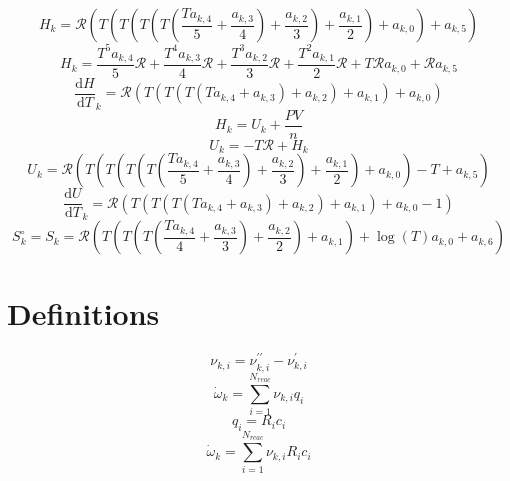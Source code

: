 \documentclass[a4paper,10pt]{article}
\newcommand{\nr}{N_{reac}}
\newcommand{\Ru}{\mathcal{R}}
\begin{document}
\begin{dmath} H_{k} = \Ru \left(T \left(T \left(T \left(T \left(\frac{T a_{k,4}}{5} + \frac{a_{k,3}}{4}\right) + \frac{a_{k,2}}{3}\right) + \frac{a_{k,1}}{2}\right) + a_{k,0}\right) + a_{k,5}\right)\end{dmath} 
\begin{dmath} H_{k} = \frac{T^{5} a_{k,4}}{5} \Ru + \frac{T^{4} a_{k,3}}{4} \Ru + \frac{T^{3} a_{k,2}}{3} \Ru + \frac{T^{2} a_{k,1}}{2} \Ru + T \Ru a_{k,0} + \Ru a_{k,5}\end{dmath} 
\begin{dmath} \frac{\text{d} H }{\text{d} T }_{k} = \Ru \left(T \left(T \left(T \left(T a_{k,4} + a_{k,3}\right) + a_{k,2}\right) + a_{k,1}\right) + a_{k,0}\right)\end{dmath} 
\begin{dmath} H_k = U_k + \frac{P V}{n}\end{dmath} 
\begin{dmath} U_{k} = - T \Ru + H_{k}\end{dmath} 
\begin{dmath} U_{k} = \Ru \left(T \left(T \left(T \left(T \left(\frac{T a_{k,4}}{5} + \frac{a_{k,3}}{4}\right) + \frac{a_{k,2}}{3}\right) + \frac{a_{k,1}}{2}\right) + a_{k,0}\right) - T + a_{k,5}\right)\end{dmath} 
\begin{dmath} \frac{\text{d} U }{\text{d} T }_{k} = \Ru \left(T \left(T \left(T \left(T a_{k,4} + a_{k,3}\right) + a_{k,2}\right) + a_{k,1}\right) + a_{k,0} - 1\right)\end{dmath} 
\begin{dmath} S_k^{\circ} = S_{k} = \Ru \left(T \left(T \left(T \left(\frac{T a_{k,4}}{4} + \frac{a_{k,3}}{3}\right) + \frac{a_{k,2}}{2}\right) + a_{k,1}\right) + \log{\left (T \right )} a_{k,0} + a_{k,6}\right)\end{dmath} 
\section{Definitions}
\begin{dmath} \nu_{k,i} = \nu^{\prime\prime}_{k,i} - \nu^{\prime}_{k,i}\end{dmath} 
\begin{dmath} \dot{\omega}_{k} = \sum_{i=1}^{\nr} \nu_{k,i} q_{i}\end{dmath} 
\begin{dmath} q_{i} = R_{i} c_{i}\end{dmath} 
\begin{dmath} \dot{\omega}_{k} = \sum_{i=1}^{\nr} \nu_{k,i} R_{i} c_{i}\end{dmath} 
\end{document}
